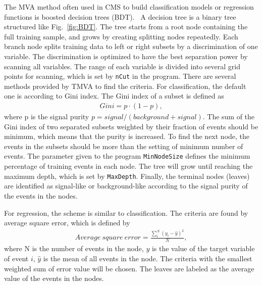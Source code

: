 The MVA method often used in CMS to build classification models or regression functions is boosted decision trees (BDT).~\cite{Hocker:2007ht}
A decision tree is a binary tree structured like Fig.~\ref{fig:BDT}.
The tree starts from a root node containing the full training sample, and grows by creating splitting nodes repeatedly.
Each branch node splits training data to left or right subsets by a discrimination of one variable.
The discrimination is optimized to have the best separation power by scanning all variables.
The range of each variable is divided into several grid points for scanning, which is set by \verb|nCut| in the program.
There are several methods provided by TMVA to find the criteria.
For classification, the default one is according to Gini index.
The Gini index of a subset is defined as 
\begin{equation} \label{eq:GiniIndex}
  \begin{aligned}
	Gini = p \cdot ( 1 - p ) ,
  \end{aligned}
\end{equation}
where p is the signal purity $p = signal / (background + signal)$.
The sum of the Gini index of two separated subsets weighted by their fraction of events should be minimum, which means that the purity is increased.
To find the next node, the events in the subsets should be more than the setting of minimum number of events.
The parameter given to the program \verb|MinNodeSize| defines the minimum percentage of training events in each node.
The tree will grow until reaching the maximum depth, which is set by \verb|MaxDepth|. 
Finally, the terminal nodes (leaves) are identified as signal-like or background-like according to the signal purity of the events in the nodes.

For regression, the scheme is similar to classification. The criteria are found by average square error, which is defined by 
\begin{equation} \label{eq:RegAvgSqrtErr}
  \begin{aligned}
	Average\ square\ error = \frac{\sum\limits_{i}^{N}(y_{i}-\hat{y})^{2}}{N} ,
  \end{aligned}
\end{equation}
where N is the number of events in the node, $y$ is the value of the target variable of event $i$, $\hat{y}$ is the mean of all events in the node.
The criteria with the smallest weighted sum of error value will be chosen. The leaves are labeled as the average value of the events in the nodes.

